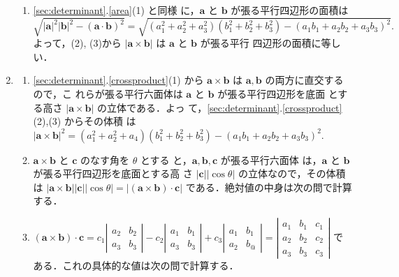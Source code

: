 \documentclass[11pt, uplatex, dvipdfmx]{jsarticle}
\begin{document}
\begin{enumerate}
\begin{enumerate}[(1)]
  \item \ref{sec:determinant}.\ref{area}(1) と同様
    に，$\bm{a}$ と $\bm{b}$ が張る平行四辺形の面積は
    \[
      \sqrt{ |\bm{a}|^2|\bm{b}|^2 - (\bm{a} \cdot \bm{b})^2} =
      \sqrt{(a_1^2+a_2^2+a_3^2) (b_1^2+b_2^2+b_3^2) - (a_1b_1 + a_2b_2
        + a_3b_3)^2}.
    \]
    よって，(2), (3)から $|\bm{a} \times \bm{b}|$ は $\bm{a}$ と $\bm{b}$ が張る平行
    四辺形の面積に等しい．
  \end{enumerate}

\item \label{volume}
  \begin{enumerate}[(1)]
    \setlength{\itemsep}{1ex}
    
  \item \ref{sec:determinant}.\ref{crossproduct}(1) から
    $\bm{a} \times \bm{b}$ は $\bm{a}, \bm{b}$ の両方に直交するので，こ
    れらが張る平行六面体は $\bm{a}$ と $\bm{b}$ が張る平行四辺形を底面
    とする高さ $|\bm{a}\times \bm{b}|$ の立体である．よっ
    て，\ref{sec:determinant}.\ref{crossproduct}(2),(3) からその体積
    は
    $|\bm{a} \times \bm{b}|^2
    =(a_1^2+a_2^2+a_4)(b_1^2+b_2^2+b_3^2)-(a_1b_1 + a_2b_2 +
    a_3b_3)^2$.

  \item $\bm{a} \times \bm{b}$ と $\bm{c}$ のなす角を $\theta$ とする
    と，$\bm{a}, \bm{b}, \bm{c}$ が張る平行六面体
    は，$\bm{a}$ と $\bm{b}$ が張る平行四辺形を底面とする高
    さ $|\bm{c}| |\cos \theta|$ の立体なので，その体積は
    $|\bm{a} \times \bm{b}| |\bm{c}| |\cos \theta| = \left| (\bm{a}
      \times \bm{b}) \cdot \bm{c}\right|$ である．絶対値の中身は次の問で計算する．

  \item $(\bm{a} \times \bm{b}) \cdot \bm{c} = c_1 \left|
      \begin{array}{cc}
        a_2 & b_2\\
        a_3 & b_3
      \end{array}
    \right| - c_2 \left|
      \begin{array}{cc}
        a_1 & b_1\\
        a_3 & b_3
      \end{array}
      \right| + c_3 \left|
        \begin{array}{cc}
          a_1 & b_1\\
          a_2 & b_@
        \end{array}
      \right| = \left|
        \begin{array}{ccc}
          a_1 & b_1 & c_1\\
          a_2 & b_2 & c_2\\
          a_3 & b_3 & c_3
        \end{array}
        \right|$ である．これの具体的な値は次の問で計算する．


\end{enumerate}
\end{enumerate}
\end{document}
